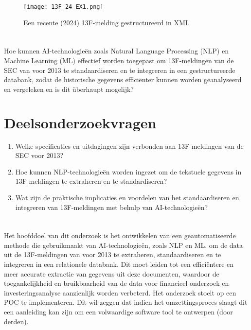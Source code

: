 \begin{figure}[hbt!]
    \texttt{[image: 13F\_24\_EX1.png]}
    \caption[13F voorbeeld 7]{\label{fig:voorbeeld na 2013 - inleiding}Een recente (2024) 13F-melding gestructureerd in XML}
\end{figure}
\section{}%
\label{sec:onderzoeksvraag}

Hoe kunnen AI-technologieën zoals Natural Language Processing (NLP) en Machine Learning (ML) effectief worden toegepast om 13F-meldingen van de SEC van voor 2013 te standaardiseren en te integreren in een gestructureerde databank, zodat de historische gegevens efficiënter kunnen worden geanalyseerd en vergeleken en is dit überhaupt mogelijk?

\section{Deelsonderzoekvragen}
\begin{enumerate}
    \item Welke specificaties en uitdagingen zijn verbonden aan 13F-meldingen van de SEC voor 2013?
    \item Hoe kunnen NLP-technologieën worden ingezet om de tekstuele gegevens in 13F-meldingen te extraheren en te standardiseren?
    \item Wat zijn de praktische implicaties en voordelen van het standaardiseren en integreren van 13F-meldingen met behulp van AI-technologieën?
    
\end{enumerate}
\section{}%
\label{sec:onderzoeksdoelstelling}

Het hoofddoel van dit onderzoek is het ontwikkelen van een geautomatiseerde methode die gebruikmaakt van AI-technologieën, zoals NLP en ML, om de data uit de 13F-meldingen van voor 2013 te extraheren, standaardiseren en te integreren in een relationele databank. Dit moet leiden tot een efficiëntere en meer accurate extractie van gegevens uit deze documenten, waardoor de toegankelijkheid en bruikbaarheid van de data voor financieel onderzoek en investeringsanalyse aanzienlijk worden verbeterd. 
Het onderzoek stoelt op een POC te implementeren. Dit wil zeggen dat indien het omzettingsproces slaagt dit een aanleiding kan zijn om een volwaardige software tool te ontwerpen (door derden).


